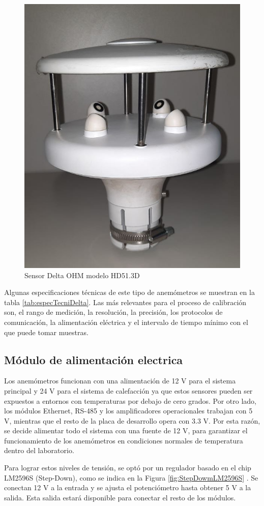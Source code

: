 \begin{figure}[H]
    \centering
    \includegraphics[width=0.4\linewidth]{Figuras/datalogger/Hardware/sensorDeltaOhm.jpg}
    \caption{Sensor Delta OHM modelo HD51.3D}
    \label{fig:sensorDeltaOhm}
\end{figure}
 Algunas especificaciones técnicas de este tipo de anemómetros se muestran en la tabla \ref{tab:especTecniDelta}. Las más relevantes para el proceso de calibración son, el rango de medición, la resolución, la precisión, los protocolos de comunicación, la alimentación eléctrica y el intervalo de tiempo mínimo con el que puede tomar muestras. 

\subsection{Módulo de alimentación electrica}\label{sec:moduloAlimentacionElectrica}

Los anemómetros funcionan con una alimentación de 12 \unit{\volt} para el sistema principal y 24 \unit{\volt} para el sistema de calefacción ya que estos sensores pueden ser expuestos a entornos con temperaturas por debajo de cero grados. Por otro lado, los módulos Ethernet, RS-485 y los amplificadores operacionales trabajan con 5 \unit{\volt}, mientras que el resto de la placa de desarrollo opera con 3.3 \unit{\volt}. Por esta razón, se decide alimentar todo el sistema con una fuente de 12 \unit{\volt}, para garantizar el funcionamiento de los anemómetros en condiciones normales de temperatura dentro del laboratorio.

Para lograr estos niveles de tensión, se optó por un regulador basado en el chip LM2596S (Step-Down), como se indica en la Figura \ref{fig:StepDowmLM2596S}
. Se conectan 12 \unit{\volt} a la entrada y se ajusta el potenciómetro hasta obtener 5 \unit{\volt} a la salida. Esta salida estará disponible para conectar el resto de los módulos.

